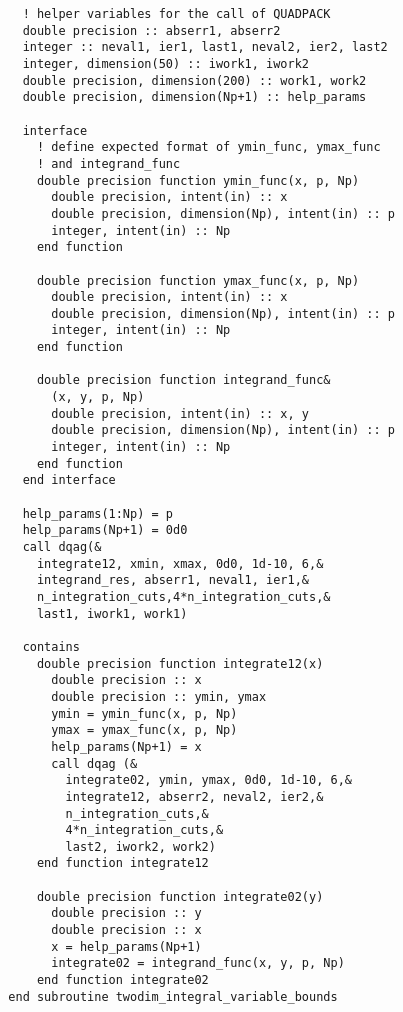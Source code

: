 \documentclass[\main/dresen_thesis.tex]{subfiles}
\begin{document}
\begin{lstlisting}
    ! helper variables for the call of QUADPACK
    double precision :: abserr1, abserr2
    integer :: neval1, ier1, last1, neval2, ier2, last2
    integer, dimension(50) :: iwork1, iwork2
    double precision, dimension(200) :: work1, work2
    double precision, dimension(Np+1) :: help_params

    interface
      ! define expected format of ymin_func, ymax_func
      ! and integrand_func
      double precision function ymin_func(x, p, Np)
        double precision, intent(in) :: x
        double precision, dimension(Np), intent(in) :: p
        integer, intent(in) :: Np
      end function

      double precision function ymax_func(x, p, Np)
        double precision, intent(in) :: x
        double precision, dimension(Np), intent(in) :: p
        integer, intent(in) :: Np
      end function

      double precision function integrand_func&
        (x, y, p, Np)
        double precision, intent(in) :: x, y
        double precision, dimension(Np), intent(in) :: p
        integer, intent(in) :: Np
      end function
    end interface

    help_params(1:Np) = p
    help_params(Np+1) = 0d0
    call dqag(&
      integrate12, xmin, xmax, 0d0, 1d-10, 6,&
      integrand_res, abserr1, neval1, ier1,&
      n_integration_cuts,4*n_integration_cuts,&
      last1, iwork1, work1)

    contains
      double precision function integrate12(x)
        double precision :: x
        double precision :: ymin, ymax
        ymin = ymin_func(x, p, Np)
        ymax = ymax_func(x, p, Np)
        help_params(Np+1) = x
        call dqag (&
          integrate02, ymin, ymax, 0d0, 1d-10, 6,&
          integrate12, abserr2, neval2, ier2,&
          n_integration_cuts,&
          4*n_integration_cuts,&
          last2, iwork2, work2)
      end function integrate12

      double precision function integrate02(y)
        double precision :: y
        double precision :: x
        x = help_params(Np+1)
        integrate02 = integrand_func(x, y, p, Np)
      end function integrate02
  end subroutine twodim_integral_variable_bounds
  \end{lstlisting}
\end{document}
